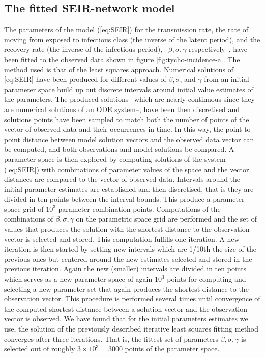 \documentclass[10pt,a4paper]{article}
\begin{document}
\subsection*{The fitted SEIR-network model}
The parameters of the model (\ref{eq:SEIR}) for the transmission rate, the rate of moving from exposed to infectious class (the inverse of the latent period), and the recovery rate (the inverse of the infectious period), --$\beta, \sigma, \gamma$ respectively--,  have been fitted to the observed data shown in figure \ref{fig:tycho-incidence-a}. The method used is that of the least squares approach. Numerical solutions of \ref{eq:SEIR} have been produced for different values of  $\beta, \sigma$, and $\gamma$  from an initial parameter space build up out discrete intervals around initial value estimates of the parameters. The produced solutions --which are nearly continuous since they are numerical solutions of an ODE system--, have been then discretised and solutions points have been sampled to match both the number of points of the vector of observed data and their occurrences in time. 
%
In this way, the point-to-point distance between model solution vectors and the observed data vector can be computed, and both observations and model solutions be compared. 
%
A parameter space is then explored by computing solutions of the system (\ref{eq:SEIR}) with combinations of parameter values of the space and the vector distances are compared to the vector of observed data. 
%
Intervals around the initial parameter estimates are established and then discretised, that is they are divided in ten points between the interval bounds. This produce a parameter space grid of $10^3$ parameter combination points.
%
Computations of the combinations of $\beta, \sigma, \gamma$ on the parametric space grid are performed and the set of values that produces the solution with the shortest distance to the observation vector is selected and stored. This computation fulfills one iteration.
%
A new iteration is then started by setting new intervals which are 1/10th the size of the previous ones but centered around the new estimates selected and stored in the previous iteration.  Again the new (smaller) intervals are divided in ten points which serves as a new parameter space of again $10^3$ points for computing and selecting a new parameter set that again produces the shortest distance to the observation vector. 
%
This procedure is performed several times until convergence of the computed shortest distance between a solution vector and the observation vector is observed.
%
We have found that for the initial parameters estimates we use, the solution of the previously described iterative least squares fitting method converges after three iterations. That is, the fittest set of parameters $\beta,\sigma,\gamma$ is selected out of roughly $3\times10^3=3000$ points of the parameter space.
\end{document}
